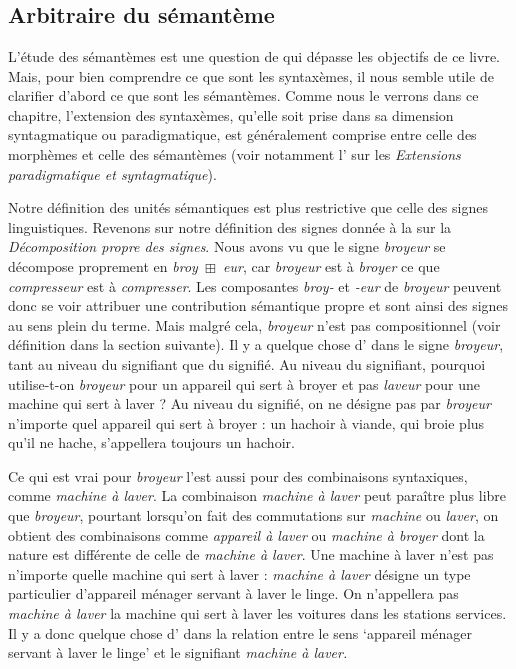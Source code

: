 \chapter{}\label{sec:2.3}

\section{Arbitraire du sémantème}\label{sec:2.3.0}\largerpage[2]

L’étude des sémantèmes est une question de  qui dépasse les objectifs de ce livre. Mais, pour bien comprendre ce que sont les syntaxèmes, il nous semble utile de clarifier d’abord ce que sont les sémantèmes. Comme nous le verrons dans ce chapitre, l’extension des syntaxèmes, qu’elle soit prise dans sa dimension syntagmatique ou paradigmatique, est généralement comprise entre celle des morphèmes et celle des sémantèmes (voir notamment l’ sur les \textit{Extensions paradigmatique et syntagmatique}).

Notre définition des unités sémantiques est plus restrictive que celle des signes linguistiques. Revenons sur notre définition des signes donnée à la  sur la \textit{Décomposition propre des signes}. Nous avons vu que le signe \textit{broyeur} se décompose proprement en \textit{broy~}${\boxplus}$\textit{~eur}, car \textit{broyeur} est à \textit{broyer} ce que \textit{compresseur} est à \textit{compresser}. Les composantes \textit{broy-} et \textit{{}-eur} de \textit{broyeur} peuvent donc se voir attribuer une contribution sémantique propre et sont ainsi des signes au sens plein du terme. Mais malgré cela, \textit{broyeur} n’est pas compositionnel (voir définition dans la section suivante). Il y a quelque chose d’ dans le signe \textit{broyeur}, tant au niveau du signifiant que du signifié. Au niveau du signifiant, pourquoi utilise-t-on \textit{broyeur} pour un appareil qui sert à broyer et pas \textit{laveur} pour une machine qui sert à laver ? Au niveau du signifié, on ne désigne pas par \textit{broyeur} n’importe quel appareil qui sert à broyer : un hachoir à viande, qui broie plus qu’il ne hache, s’appellera toujours un hachoir.

Ce qui est vrai pour \textit{broyeur} l’est aussi pour des combinaisons syntaxiques, comme \textit{machine à laver}. La combinaison \textit{machine à laver} peut paraître plus libre que \textit{broyeur}, pourtant lorsqu’on fait des commutations sur \textit{machine} ou \textit{laver}, on obtient des combinaisons comme \textit{appareil à laver} ou \textit{machine à broyer} dont la nature est différente de celle de \textit{machine à laver}. Une machine à laver n’est pas n’importe quelle machine qui sert à laver : \textit{machine à laver} désigne un type particulier d’appareil ménager servant à laver le linge. On n’appellera pas \textit{machine à laver} la machine qui sert à laver les voitures dans les stations services. Il y a donc quelque chose d’ dans la relation entre le sens ‘appareil ménager servant à laver le linge’ et le signifiant \textit{machine à laver.}

